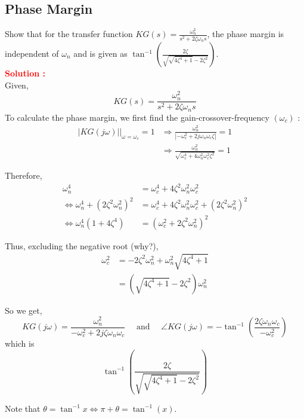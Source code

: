 \documentclass[12pt]{article}
\begin{document}
\subsection{Phase Margin}

Show that for the transfer function $K G(s)=\frac{\omega_n^2}{s^2+2 \zeta \omega_n s}$, the phase margin is independent of $\omega_n$ and is given as $\tan ^{-1}\left(\frac{2 \zeta}{\sqrt{\sqrt{4 \zeta^4+1}-2 \zeta^2}}\right)$. \\
\textbf{\textcolor{red}{Solution :}}\\

Given,
$$ K G(s)=\frac{\omega_n^2}{s^2+2 \zeta \omega_n s} $$
To calculate the phase margin, we first find the gain-crossover-frequency $\left(\omega_c\right)$ :
\begin{align*}
\left.|K G(j \omega)|\right|_{\omega=\omega_c}=1 & \Rightarrow \frac{\omega_n^2}{\left|-\omega_c^2+2 j \omega_n \omega_c \zeta\right|}=1 \\
& \Rightarrow \frac{\omega_n^2}{\sqrt{\omega_c^4+4 \omega_n^2 \omega_c^2 \zeta^2}}=1
\end{align*}

\noindent  Therefore,
\begin{align}
\omega_n^4 & =\omega_c^4+4 \zeta^2 \omega_n^2 \omega_c^2  \nonumber  \nonumber  \\
\Leftrightarrow \omega_n^4+\left(2 \zeta^2 \omega_n^2\right)^2 & =\omega_c^4+4 \zeta^2 \omega_n^2 \omega_c^2+\left(2 \zeta^2 \omega_n^2\right)^2 \nonumber  \\
\Leftrightarrow \omega_n^4\left(1+4 \zeta^4\right) & =\left(\omega_c^2+2 \zeta^2 \omega_n^2\right)^2 \nonumber 
\end{align}

\noindent  Thus, excluding the negative root (why?),
$$
\begin{aligned}
\omega_c^2 & =-2 \zeta^2 \omega_n^2+\omega_n^2 \sqrt{4 \zeta^4+1} \nonumber  \\
& =\left(\sqrt{4 \zeta^4+1}-2 \zeta^2\right) \omega_n^2 \nonumber 
\end{aligned}
$$

\noindent  So we get,
$$ K G(j \omega)=\frac{\omega_n^2}{-\omega_c^2+2 j \zeta \omega_n \omega_c} \quad \text { and } \quad \angle K G(j \omega)=-\tan ^{-1}\left(\frac{2 \zeta \omega_n \omega_c}{-\omega_c^2}\right) $$
which is
$$ \tan ^{-1}\left(\frac{2 \zeta}{\sqrt{\sqrt{4 \zeta^4+1}-2 \zeta^2}}\right) $$

\noindent  Note that $\theta=\tan ^{-1} x \Longleftrightarrow \pi+\theta=\tan ^{-1}(x)$.\\
\end{document}
